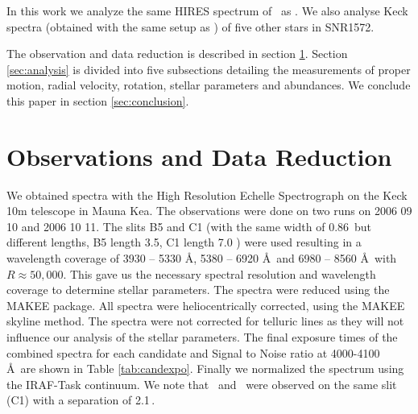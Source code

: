 In this work we analyze the same HIRES spectrum of \starg\ as \gh. We also analyse Keck spectra (obtained with the same setup as \starg) of five other stars in SNR1572. 

The observation and data reduction is described in section \ref{sec:observ-data-reduct}. Section \ref{sec:analysis} is divided into five subsections detailing the measurements of proper motion, radial velocity, rotation, stellar parameters and abundances. We conclude this paper in section \ref{sec:conclusion}.



\section{Observations and Data Reduction}
\label{sec:observ-data-reduct}

We obtained spectra with the High Resolution Echelle Spectrograph \citep[HIRES][]{1994SPIE.2198..362V} on the Keck 10m telescope in Mauna Kea. The observations were done on two runs on 2006 09 10 and 2006 10 11.  The slits B5 and C1 (with the same width of 0.86\arcsec\ but different lengths, B5 length 3.5\arcsec, C1 length 7.0 \arcsec) were used resulting in a wavelength coverage of 3930 -- 5330 \AA, 5380 -- 6920 \AA\ and 6980 -- 8560 \AA\ with $R\approx 50,000$. This gave us the necessary spectral resolution and wavelength coverage to determine stellar parameters. 
The spectra were reduced using the MAKEE package. All spectra were heliocentrically corrected, using the MAKEE skyline method. The spectra were not corrected for telluric lines as they will not influence our analysis of the stellar parameters. The final exposure times of the combined spectra for each candidate and Signal to Noise ratio at 4000-4100 \AA\ are shown in Table \ref{tab:candexpo}. Finally we normalized the spectrum using the IRAF-Task continuum. We note that \starc\ and \stard\ were observed on the same slit (C1) with a separation of 2.1\,\arcsec.




